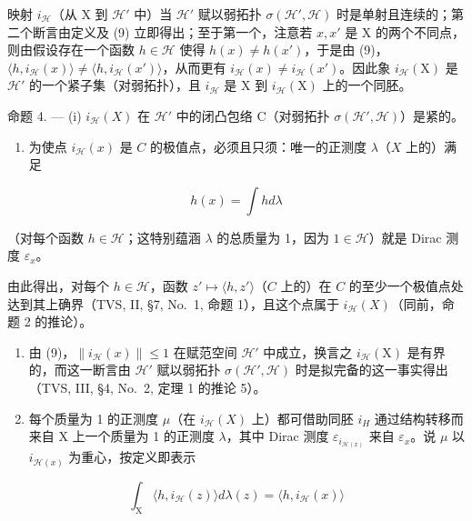 映射 \(i_{\mathcal{H}}\)（从 X 到 \(\mathcal{H}'\) 中）当 \(\mathcal{H}'\) 赋以弱拓扑 \(\sigma(\mathcal{H}', \mathcal{H})\) 时是单射且连续的；第二个断言由定义及 (9) 立即得出；至于第一个，注意若 \(x, x'\) 是 X 的两个不同点，则由假设存在一个函数 \(h \in \mathcal{H}\) 使得 \(h(x) \neq h(x')\)，于是由 (9)，\(\langle h, i_{\mathcal{H}}(x) \rangle \neq \langle h, i_{\mathcal{H}}(x') \rangle\)，从而更有 \(i_{\mathcal{H}}(x) \neq i_{\mathcal{H}}(x')\)。因此象 \(i_{\mathcal{H}}(\mathrm{X})\) 是 \(\mathcal{H}'\) 的一个紧子集（对弱拓扑），且 \(i_{\mathcal{H}}\) 是 X 到 \(i_{\mathcal{H}}(\mathrm{X})\) 上的一个同胚。

命题 4. --- (i) \(i_{\mathcal{H}}(X)\) 在 \(\mathcal{H}'\) 中的闭凸包络 C（对弱拓扑 \(\sigma(\mathcal{H}', \mathcal{H})\)）是紧的。

\begin{enumerate}
\def\labelenumi{(\roman{enumi})}
\setcounter{enumi}{1}
\tightlist
\item
  为使点 \(i_{\mathcal{H}}(x)\) 是 \(C\) 的极值点，必须且只须：唯一的正测度 \(\lambda\)（\(X\) 上的）满足
\end{enumerate}

\[
h (x) = \int h d \lambda\tag{10}
\]

（对每个函数 \(h \in \mathcal{H}\)；这特别蕴涵 \(\lambda\) 的总质量为 1，因为 \(1 \in \mathcal{H}\)）就是 Dirac 测度 \(\varepsilon_x\)。

由此得出，对每个 \(h \in \mathcal{H}\)，函数 \(z' \mapsto \langle h, z' \rangle\)（\(C\) 上的）在 \(C\) 的至少一个极值点处达到其上确界（TVS, II, §7, No.~1, 命题 1），且这个点属于 \(i_{\mathcal{H}}(X)\)（同前，命题 2 的推论）。

\begin{enumerate}
\def\labelenumi{(\roman{enumi})}
\item
  由 (9)，\(\| i_{\mathcal{H}}(x)\| \leqslant 1\) 在赋范空间 \(\mathcal{H}'\) 中成立，换言之 \(i_{\mathcal{H}}(\mathrm{X})\) 是有界的，而这一断言由 \(\mathcal{H}'\) 赋以弱拓扑 \(\sigma (\mathcal{H}',\mathcal{H})\) 时是拟完备的这一事实得出（TVS, III, §4, No.~2, 定理 1 的推论 5）。
\item
  每个质量为 1 的正测度 \(\mu\)（在 \(i_{\mathcal{H}}(X)\) 上）都可借助同胚 \(i_{H}\) 通过结构转移而来自 X 上一个质量为 1 的正测度 \(\lambda\)，其中 Dirac 测度 \(\varepsilon_{i_{\mathcal{H}(x)}}\) 来自 \(\varepsilon_{x}\)。说 \(\mu\) 以 \(i_{\mathcal{H}(x)}\) 为重心，按定义即表示
\end{enumerate}

\[
\int_ {\mathrm{X}} \langle h, i _ {\mathcal {H}} (z) \rangle d \lambda (z) = \langle h, i _ {\mathcal {H}} (x) \rangle
\]

